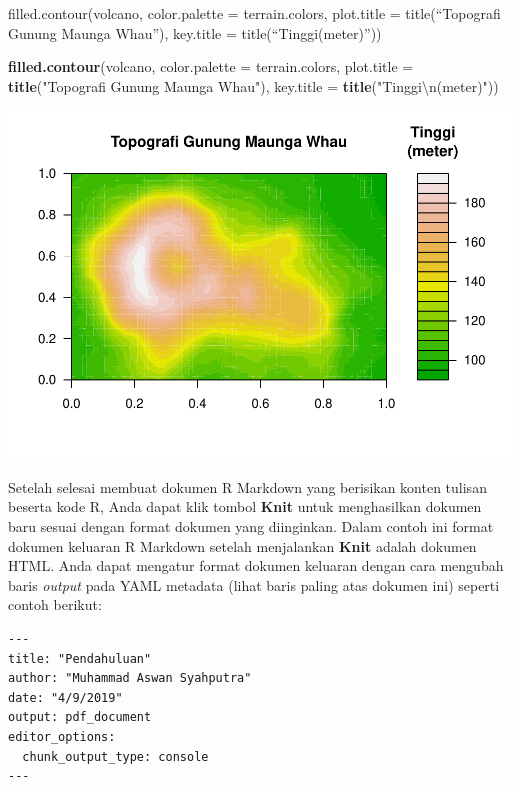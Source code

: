 \documentclass[]{article}
\newenvironment{Shaded}{\begin{snugshade}}{\end{snugshade}}
\newcommand{\KeywordTok}[1]{\textcolor[rgb]{0.13,0.29,0.53}{\textbf{#1}}}
\newcommand{\DataTypeTok}[1]{\textcolor[rgb]{0.13,0.29,0.53}{#1}}
\newcommand{\CharTok}[1]{\textcolor[rgb]{0.31,0.60,0.02}{#1}}
\newcommand{\StringTok}[1]{\textcolor[rgb]{0.31,0.60,0.02}{#1}}
\newcommand{\NormalTok}[1]{#1}
\begin{document}
filled.contour(volcano, color.palette = terrain.colors, plot.title =
title(``Topografi Gunung Maunga Whau''), key.title =
title(``Tinggi\n(meter)''))

\begin{Shaded}
\begin{Highlighting}[]
\KeywordTok{filled.contour}\NormalTok{(volcano,}
               \DataTypeTok{color.palette =}\NormalTok{ terrain.colors, }
               \DataTypeTok{plot.title =} \KeywordTok{title}\NormalTok{(}\StringTok{"Topografi Gunung Maunga Whau"}\NormalTok{), }
               \DataTypeTok{key.title =} \KeywordTok{title}\NormalTok{(}\StringTok{"Tinggi}\CharTok{\textbackslash{}n}\StringTok{(meter)"}\NormalTok{))}
\end{Highlighting}
\end{Shaded}

\includegraphics{001_pendahuluan_files/figure-latex/unnamed-chunk-2-1.pdf}

Setelah selesai membuat dokumen R Markdown yang berisikan konten tulisan
beserta kode R, Anda dapat klik tombol \textbf{Knit} untuk menghasilkan
dokumen baru sesuai dengan format dokumen yang diinginkan. Dalam contoh
ini format dokumen keluaran R Markdown setelah menjalankan \textbf{Knit}
adalah dokumen HTML. Anda dapat mengatur format dokumen keluaran dengan
cara mengubah baris \emph{output} pada YAML metadata (lihat baris paling
atas dokumen ini) seperti contoh berikut:

\begin{verbatim}
---
title: "Pendahuluan"
author: "Muhammad Aswan Syahputra"
date: "4/9/2019"
output: pdf_document
editor_options: 
  chunk_output_type: console
---
\end{verbatim}
\end{document}
